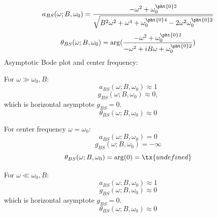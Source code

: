 \documentclass[a4paper,12pt]{report}
\begin{document}
\[a_{BS}(\omega;B,\omega_0)=\frac{-\omega^2+\omega_0^{\pht{0}2}}{\sqrt{B^2\omega^2+\omega^4+\omega_0^{\pht{0}4}-2\omega^2\omega_0^{\pht{0}2}}}\]
\[\theta_{BS}(\omega;B,\omega_0)=\arg(\frac{-\omega^2+\omega_0^{\pht{0}2}}{-\omega^2+iB\omega+\omega_0^{\pht{0}2}})\]
Asymptotic Bode plot and center frequency:
\bit
\item For $\omega\gg\omega_0,B$:
\[a_{BS}(\omega;B,\omega_0)\approx1\]
\[g_{BS}(\omega;B,\omega_0)\approx0,\]
which is horizontal asymptote $g_{BS}=0$.
\[\theta_{BS}(\omega;B,\omega_0)\approx 0\]
\item For center frequency $\omega=\omega_0$:
\[a_{BS}(\omega;B,\omega_0)=0\]
\[g_{BS}(\omega;B,\omega_0)=-\infty\]
\[\theta_{BS}(\omega;B,\omega_0)=\arg(0)=\tx{undefined}\]
\item For $\omega\ll\omega_0,B$:
\[a_{BS}(\omega;B,\omega_0)\approx1\]
\[g_{BS}(\omega;B,\omega_0)\approx0\]
which is horizontal asymptote $g_{BS}=0$.
\[\theta_{BS}(\omega;B,\omega_0)\approx0\]
\eit
\end{document}
